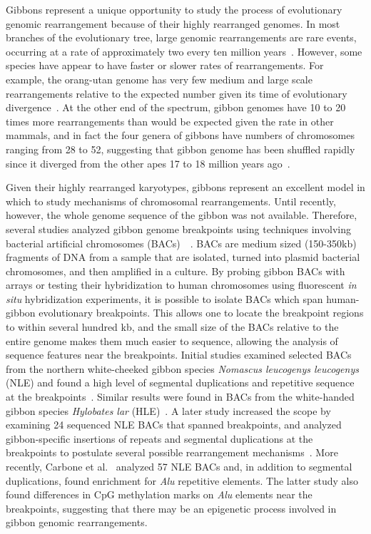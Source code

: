 Gibbons represent a unique opportunity to study the process of evolutionary genomic rearrangement because of their highly rearranged genomes. In most branches of the evolutionary tree, large genomic rearrangements are rare events, occurring at a rate of approximately two every ten million years~\cite{Wienberg:2004gt}. However, some species have appear to have faster or slower rates of rearrangements. For example, the orang-utan genome has very few medium and large scale rearrangements relative to the expected number given its time of evolutionary divergence~\cite{Locke:2011gn}. At the other end of the spectrum, gibbon genomes have 10 to 20 times more rearrangements than would be expected given the rate in other mammals, and in fact the four genera of gibbons have numbers of chromosomes ranging from 28 to 52, suggesting that gibbon genome has been shuffled rapidly since it diverged from the other apes 17 to 18 million years ago~\cite{Misceo:2008kg}.

Given their highly rearranged karyotypes, gibbons represent an excellent model in which to study mechanisms of chromosomal rearrangements. Until recently, however, the whole genome sequence of the gibbon was not available. Therefore, several studies analyzed gibbon genome breakpoints using techniques involving bacterial artificial chromosomes (BACs)~~\cite{Girirajan:2009kw,Carbone:2006jk,Carbone:2009p1012}. BACs are medium sized (150-350kb) fragments of DNA from a sample that are isolated, turned into plasmid bacterial chromosomes, and then amplified in a culture. By probing gibbon BACs with arrays or testing their hybridization to human chromosomes using fluorescent \emph{in situ} hybridization experiments, it is possible to isolate BACs which span human-gibbon evolutionary breakpoints. This allows one to locate the breakpoint regions to within several hundred kb, and the small size of the BACs relative to the entire genome makes them much easier to sequence, allowing the analysis of sequence features near the breakpoints. Initial studies examined selected BACs from the northern white-cheeked gibbon species \emph{Nomascus leucogenys leucogenys} (NLE) and found a high level of segmental duplications and repetitive sequence at the breakpoints~\cite{Carbone:2006jk,Roberto:2007dt}. Similar results were found in BACs from the white-handed gibbon species \emph{Hylobates lar} (HLE)~\cite{Misceo:2008kg}. A later study increased the scope by examining 24 sequenced NLE BACs that spanned breakpoints, and analyzed gibbon-specific insertions of repeats and segmental duplications at the breakpoints to postulate several possible rearrangement mechanisms~\cite{Girirajan:2009kw}. More recently, Carbone et al.~\cite{Carbone:2009p1012} analyzed 57 NLE BACs and, in addition to segmental duplications, found enrichment for \emph{Alu} repetitive elements. The latter study also found differences in CpG methylation marks on \emph{Alu} elements near the breakpoints, suggesting that there may be an epigenetic process involved in gibbon genomic rearrangements.

